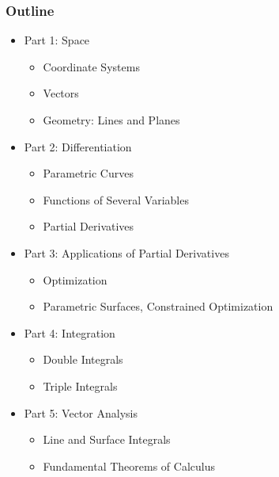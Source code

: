 \begin{frame}
\frametitle{Outline}

\begin{itemize}
  \item Part 1: Space
  \begin{itemize}
    \item Coordinate Systems
    \item Vectors
    \item Geometry: Lines and Planes
  \end{itemize}

  \item Part 2: Differentiation
    \begin{itemize}
      \item Parametric Curves
      \item Functions of Several Variables
      \item Partial Derivatives
    \end{itemize}
    
  \item Part 3: Applications of Partial Derivatives
    \begin{itemize}
      \item Optimization
      \item Parametric Surfaces, Constrained Optimization
    \end{itemize}
    
  \item Part 4: Integration
    \begin{itemize}
      \item Double Integrals
      \item Triple Integrals
    \end{itemize}
    
  \item Part 5: Vector Analysis
    \begin{itemize}
      \item Line and Surface Integrals
      \item Fundamental Theorems of Calculus
    \end{itemize}
\end{itemize}
\end{frame}


